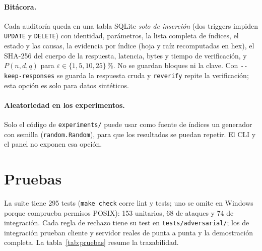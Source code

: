 \documentclass[11pt,a4paper]{article}
\newcommand{\code}[1]{\texttt{#1}}
\begin{document}
\paragraph{Bitácora.} Cada auditoría queda en una tabla SQLite \emph{solo de inserción} (dos
triggers impiden \code{UPDATE} y \code{DELETE}) con identidad, parámetros, la lista completa de
índices, el estado y las causas, la evidencia por índice (hoja y raíz recomputadas en hex), el
SHA-256 del cuerpo de la respuesta, latencia, bytes y tiempo de verificación, y $P(n,d,q)$ para
$\varepsilon\in\{1,5,10,25\}$\,\%. No se guardan bloques ni la clave. Con \code{-{}-keep-responses}
se guarda la respuesta cruda y \code{reverify} repite la verificación; esta opción es solo para datos
sintéticos.

\paragraph{Aleatoriedad en los experimentos.} Solo el código de \code{experiments/} puede usar como fuente
de índices un generador con semilla (\code{random.Random}), para que los resultados se puedan repetir. El
CLI y el panel no exponen esa opción.

\section{Pruebas}
\label{sec:pruebas}

La suite tiene 295 tests (\code{make check} corre lint y tests; uno se omite en Windows porque
comprueba permisos POSIX): 153 unitarios, 68 de ataques y 74 de integración. Cada regla de rechazo
tiene su test en \code{tests/adversarial/}; los de integración prueban cliente y servidor reales de
punta a punta y la demostración completa. La tabla~\ref{tab:pruebas} resume la trazabilidad.
\end{document}
